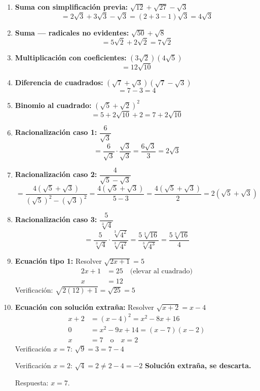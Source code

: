 \documentclass[11pt, letterpaper]{article}
\begin{document}
\begin{tcolorbox}[examplebox, title={Ejemplo guiado — operatoria completa integrada}]
\begin{enumerate}[label=\textbf{Ej. \arabic*.}, leftmargin=*]

\item \textbf{Suma con simplificación previa:} $\sqrt{12}+\sqrt{27}-\sqrt{3}$
$$= 2\sqrt{3}+3\sqrt{3}-\sqrt{3} = (2+3-1)\sqrt{3} = 4\sqrt{3}$$

\item \textbf{Suma — radicales no evidentes:} $\sqrt{50}+\sqrt{8}$
$$= 5\sqrt{2}+2\sqrt{2} = 7\sqrt{2}$$

\item \textbf{Multiplicación con coeficientes:} $(3\sqrt{2})(4\sqrt{5})$
$$= 12\sqrt{10}$$

\item \textbf{Diferencia de cuadrados:} $(\sqrt{7}+\sqrt{3})(\sqrt{7}-\sqrt{3})$
$$= 7-3 = 4$$

\item \textbf{Binomio al cuadrado:} $(\sqrt{5}+\sqrt{2})^2$
$$= 5+2\sqrt{10}+2 = 7+2\sqrt{10}$$

\item \textbf{Racionalización caso 1:} $\dfrac{6}{\sqrt{3}}$
$$= \frac{6}{\sqrt{3}}\cdot\frac{\sqrt{3}}{\sqrt{3}} = \frac{6\sqrt{3}}{3} = 2\sqrt{3}$$

\item \textbf{Racionalización caso 2:} $\dfrac{4}{\sqrt{5}-\sqrt{3}}$
$$= \frac{4(\sqrt{5}+\sqrt{3})}{(\sqrt{5})^2-(\sqrt{3})^2} = \frac{4(\sqrt{5}+\sqrt{3})}{5-3} = \frac{4(\sqrt{5}+\sqrt{3})}{2} = 2(\sqrt{5}+\sqrt{3})$$

\item \textbf{Racionalización caso 3:} $\dfrac{5}{\sqrt[3]{4}}$
$$= \frac{5}{\sqrt[3]{4}}\cdot\frac{\sqrt[3]{4^2}}{\sqrt[3]{4^2}} = \frac{5\sqrt[3]{16}}{\sqrt[3]{4^3}} = \frac{5\sqrt[3]{16}}{4}$$

\item \textbf{Ecuación tipo 1:} Resolver $\sqrt{2x+1}=5$
\begin{align*}
2x+1 &= 25 \quad \text{(elevar al cuadrado)}\\
x &= 12
\end{align*}
Verificación: $\sqrt{2(12)+1}=\sqrt{25}=5$ \checkmark

\item \textbf{Ecuación con solución extraña:} Resolver $\sqrt{x+2}=x-4$
\begin{align*}
x+2 &= (x-4)^2 = x^2-8x+16\\
0 &= x^2-9x+14 = (x-7)(x-2)\\
x &= 7 \quad \text{o} \quad x=2
\end{align*}
Verificación $x=7$: $\sqrt{9}=3=7-4$ \checkmark

Verificación $x=2$: $\sqrt{4}=2\neq 2-4=-2$ \texttimes \quad \textbf{Solución extraña, se descarta.}

Respuesta: $x=7$.

\end{enumerate}
\end{tcolorbox}
\end{document}
